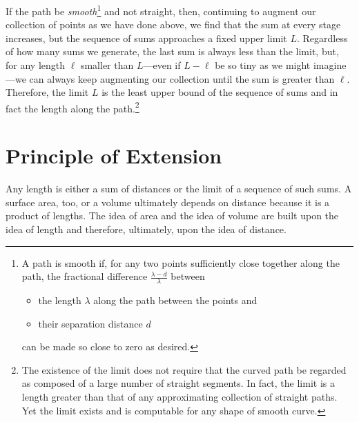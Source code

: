 If the path be \emph{smooth}\footnote{%
   A path is smooth if, for any two points sufficiently close together along
   the path, the fractional difference $\frac{\lambda - d}{\lambda}$ between
   \begin{itemize}[noitemsep]
      \item the length $\lambda$ along the path between the points and
      \item their separation distance $d$
   \end{itemize}
   can be made so close to zero as desired.%
}
and not straight, then, continuing to augment our collection of points as we
have done above, we find that the sum at every stage increases, but the
sequence of sums approaches a fixed upper limit $L$.  Regardless of how many
sums we generate, the last sum is always less than the limit, but, for any
length $\ell$ smaller than $L$---even if $L - \ell$ be so tiny as we might
imagine---we can always keep augmenting our collection until the sum is greater
than $\ell$.  Therefore, the limit $L$ is the least upper bound of the sequence
of sums and in fact the length along the path.\footnote{%
   The existence of the limit does not require that the curved path be regarded
   as composed of a large number of straight segments. In fact, the limit is a
   length greater than that of any approximating collection of straight paths.
   Yet the limit exists and is computable for any shape of smooth curve.%
}

\section{Principle of Extension}

Any length is either a sum of distances or the limit of a sequence of such
sums. A surface area, too, or a volume ultimately depends on distance because
it is a product of lengths.  The idea of area and the idea of volume are built
upon the idea of length and therefore, ultimately, upon the idea of distance.

